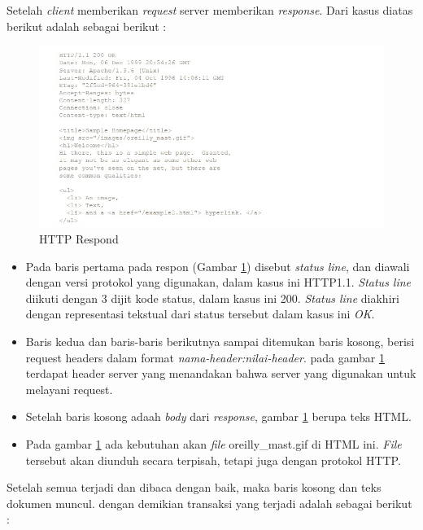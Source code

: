 Setelah \textit{client} memberikan \textit{request} server memberikan \textit{response}. Dari kasus diatas berikut adalah sebagai berikut :
			\begin{figure}[H]
				\centering		
				\includegraphics[scale=0.6]{Gambar/respondserver.jpg}
				\caption[HTTP Respond]{HTTP Respond\cite{wong2000http}}
				\label{fig:httprespond}	
			\end{figure}
 \begin{itemize}
	\item Pada baris pertama pada respon (Gambar \ref{fig:httprespond}) disebut \textit{status line}, dan diawali dengan versi protokol yang digunakan, dalam kasus ini HTTP\/1.1. \textit{Status line} diikuti dengan 3 dijit kode status, dalam kasus ini 200. \textit{Status line} diakhiri dengan representasi tekstual dari status tersebut dalam kasus ini \textit{OK}.
	\item Baris kedua dan baris-baris berikutnya sampai ditemukan baris kosong, berisi request headers dalam format \textit{nama-header:nilai-header}. pada gambar \ref{fig:httprespond} terdapat header server yang menandakan bahwa server yang digunakan untuk melayani request.
	\item Setelah baris kosong adaah \textit{body} dari \textit{response}, gambar \ref{fig:httprespond} berupa teks HTML.
	\item Pada gambar \ref{fig:httprespond} ada kebutuhan akan \textit{file} oreilly\_mast.gif di HTML ini. \textit{File} tersebut akan diunduh secara terpisah, tetapi juga dengan protokol HTTP.
\end{itemize}

Setelah semua terjadi dan dibaca dengan baik, maka baris kosong dan teks dokumen muncul. dengan demikian transaksi yang terjadi adalah sebagai berikut : 

